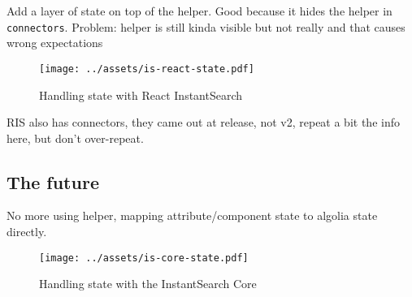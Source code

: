 Add a layer of state on top of the helper. Good because it hides the helper in {\tt connectors}. Problem: helper is still kinda visible but not really and that causes wrong expectations

\begin{figure}[H]
\label{figure:is-react-state}
  \centering
  \texttt{[image: ../assets/is-react-state.pdf]}
  \caption{Handling state with React InstantSearch}
\end{figure}

RIS also has connectors, they came out at release, not v2, repeat a bit the info here, but don't over-repeat.


\subsection{The future} %
\label{sub:the_future}

No more using helper, mapping attribute/component state to algolia state directly.

\begin{figure}[H]
\label{figure:is-core-state}
  \centering
  \texttt{[image: ../assets/is-core-state.pdf]}
  \caption{Handling state with the InstantSearch Core}
\end{figure}


